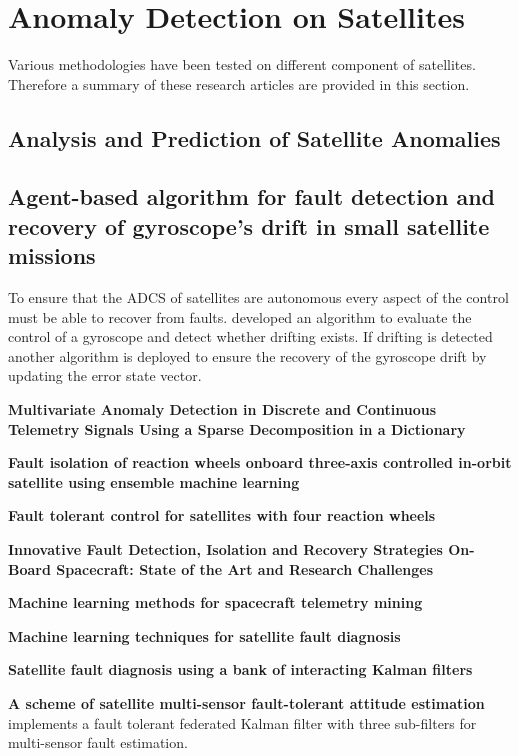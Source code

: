 \section{Anomaly Detection on Satellites}
Various methodologies have been tested on different component of satellites. Therefore a summary of these research articles are provided in this section.

\subsection{Analysis and Prediction of Satellite Anomalies}

\subsection{Agent-based algorithm for fault detection and recovery of gyroscope's drift in small satellite missions}
To ensure that the ADCS of satellites are autonomous every aspect of the control must be able to recover from faults. \cite{carvajal2017agent} developed an algorithm to evaluate the control of a gyroscope and detect whether drifting exists. If drifting is detected another algorithm is deployed to ensure the recovery of the gyroscope drift by updating the error state vector.

\textbf{Multivariate Anomaly Detection in Discrete and Continuous Telemetry Signals Using a Sparse Decomposition in a Dictionary}
\cite{Pilastre2020}

\textbf{Fault isolation of reaction wheels onboard three-axis controlled in-orbit satellite using ensemble machine learning}
\cite{rahimi2020fault}

\textbf{Fault tolerant control for satellites with four reaction wheels}
\cite{jin2008fault}

\textbf{Innovative Fault Detection, Isolation and Recovery Strategies On-Board Spacecraft: State of the Art and Research Challenges}
\cite{wander2013innovative}

\textbf{Machine learning methods for spacecraft telemetry mining}
\cite{ibrahim2018machine}

\textbf{Machine learning techniques for satellite fault diagnosis}
\cite{ibrahim2020machine}

\textbf{Satellite fault diagnosis using a bank of interacting Kalman filters}
\cite{Tudoroiu2007}

\textbf{A scheme of satellite multi-sensor fault-tolerant attitude estimation}
\cite{Zhou2016} implements a fault tolerant federated Kalman filter with three sub-filters for multi-sensor fault estimation. 

